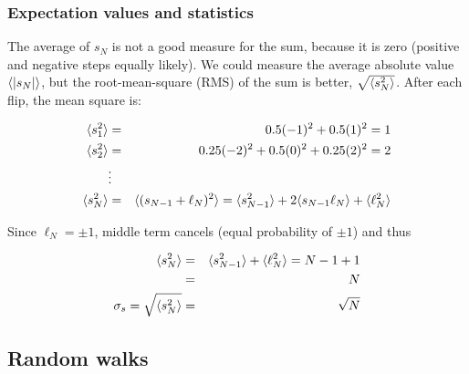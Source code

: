 \documentclass[hyperref={colorlinks=true}]{beamer}
\begin{document}

\begin{frame}%
  \frametitle{Expectation values and statistics}
  
  The average of $s_N$ is not a good measure for the sum, because it is zero (positive and negative steps equally likely). We could measure the average absolute value $\langle | s_N | \rangle$, but the root-mean-square (RMS) of the sum is better, $\sqrt{\langle s^2_N \rangle}$. After each flip, the mean square is:
  
  \begin{eqnarray}
    \langle  s^2_1  \rangle &=& 0.5 (-1)^2 +  0.5 (1)^2 = 1 \\
    \langle  s^2_2  \rangle &=& 0.25 (-2)^2 +  0.5 (0)^2 + 0.25 (2)^2  = 2 \\
    &\vdots& \\
    \langle  s^2_N  \rangle &=& \langle  (s_{N-1} + \ell_N)^2  \rangle = \langle  s^2_{N-1}  \rangle + 2 \langle s_{N-1}\ell_N \rangle + \langle \ell_N^2 \rangle
  \end{eqnarray}
  
  Since $\ell_N = \pm 1$, middle term cancels (equal probability of $\pm1$) and thus
  
  \begin{eqnarray}
    \langle  s^2_N  \rangle &=& \langle  s^2_{N-1}  \rangle + \langle \ell_N^2 \rangle = N - 1 + 1 \\ 
                   &=& N \\
    \sigma_s = \sqrt{\langle s^2_N \rangle} &=& \sqrt{N}          
  \end{eqnarray}
  
\end{frame}

\subsection[Random walks]{Random walks}
\end{document}
